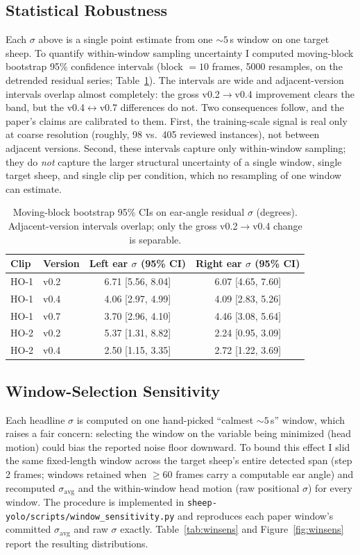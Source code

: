 \documentclass[11pt]{article}
\newcommand{\sigavg}{\ensuremath{\sigma_{\text{avg}}}}
\begin{document}
\subsection{Statistical Robustness}
\label{sec:ci}
Each $\sigma$ above is a single point estimate from one ${\sim}5$\,s window on one
target sheep. To quantify within-window sampling uncertainty I computed
moving-block bootstrap 95\% confidence intervals (block $=10$ frames, 5000
resamples, on the detrended residual series; Table~\ref{tab:ci}). The intervals
are wide and adjacent-version intervals overlap almost completely: the gross
v0.2$\rightarrow$v0.4 improvement clears the band, but the
v0.4$\leftrightarrow$v0.7 differences do not. Two consequences follow, and the
paper's claims are calibrated to them. First, the training-scale signal is real
only at coarse resolution (roughly, 98 vs.\ 405 reviewed instances), not between
adjacent versions. Second, these intervals capture only within-window sampling;
they do \emph{not} capture the larger structural uncertainty of a single window,
single target sheep, and single clip per condition, which no resampling of one
window can estimate.

\begin{table}[t]
  \centering
  \caption{Moving-block bootstrap 95\% CIs on ear-angle residual $\sigma$
  (degrees). Adjacent-version intervals overlap; only the gross
  v0.2$\rightarrow$v0.4 change is separable.}
  \label{tab:ci}
  \begin{tabular}{llcc}
    \toprule
    Clip & Version & Left ear $\sigma$ (95\% CI) & Right ear $\sigma$ (95\% CI) \\
    \midrule
    HO-1 & v0.2 & 6.71 [5.56, 8.04] & 6.07 [4.65, 7.60] \\
    HO-1 & v0.4 & 4.06 [2.97, 4.99] & 4.09 [2.83, 5.26] \\
    HO-1 & v0.7 & 3.70 [2.96, 4.10] & 4.46 [3.08, 5.64] \\
    HO-2 & v0.2 & 5.37 [1.31, 8.82] & 2.24 [0.95, 3.09] \\
    HO-2 & v0.4 & 2.50 [1.15, 3.35] & 2.72 [1.22, 3.69] \\
    \bottomrule
  \end{tabular}
\end{table}

\subsection{Window-Selection Sensitivity}
\label{sec:winsens}
Each headline $\sigma$ is computed on one hand-picked ``calmest ${\sim}5$\,s''
window, which raises a fair concern: selecting the window on the variable being
minimized (head motion) could bias the reported noise floor downward. To bound
this effect I slid the same fixed-length window across the target sheep's entire
detected span (step 2 frames; windows retained when $\geq 60$ frames carry a
computable ear angle) and recomputed $\sigavg$ and the within-window head motion
(raw positional $\sigma$) for every window. The procedure is implemented in
\texttt{sheep-yolo/scripts/window\_sensitivity.py} and reproduces each paper
window's committed $\sigavg$ and raw $\sigma$ exactly. Table~\ref{tab:winsens}
and Figure~\ref{fig:winsens} report the resulting distributions.
\end{document}
